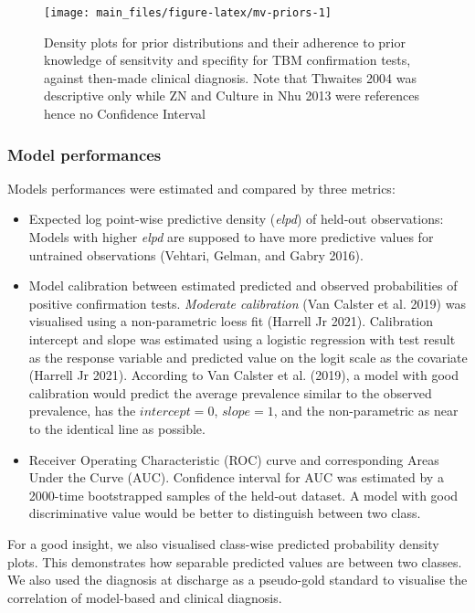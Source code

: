 \documentclass[
]{article}
\begin{document}
\begin{figure}

{\centering \texttt{[image: main\_files/figure-latex/mv-priors-1]} 

}

\caption{Density plots for prior distributions and their adherence to prior knowledge of sensitvity and specifity for TBM confirmation tests, against then-made clinical diagnosis. Note that Thwaites 2004 was descriptive only while ZN and Culture in Nhu 2013 were references hence no Confidence Interval}\label{fig:mv-priors}
\end{figure}

\hypertarget{model-performances}{%
\subsubsection{Model performances}\label{model-performances}}

Models performances were estimated and compared by three metrics:

\begin{itemize}
\item
  Expected log point-wise predictive density (\emph{elpd}) of held-out observations: Models with higher \emph{elpd} are supposed to have more predictive values for untrained observations (Vehtari, Gelman, and Gabry 2016).
\item
  Model calibration between estimated predicted and observed probabilities of positive confirmation tests. \emph{Moderate calibration} (Van Calster et al. 2019) was visualised using a non-parametric loess fit (Harrell Jr 2021). Calibration intercept and slope was estimated using a logistic regression with test result as the response variable and predicted value on the logit scale as the covariate (Harrell Jr 2021). According to Van Calster et al. (2019), a model with good calibration would predict the average prevalence similar to the observed prevalence, has the \(intercept = 0\), \(slope = 1\), and the non-parametric as near to the identical line as possible.
\item
  Receiver Operating Characteristic (ROC) curve and corresponding Areas Under the Curve (AUC). Confidence interval for AUC was estimated by a 2000-time bootstrapped samples of the held-out dataset. A model with good discriminative value would be better to distinguish between two class.
\end{itemize}

For a good insight, we also visualised class-wise predicted probability density plots. This demonstrates how separable predicted values are between two classes. We also used the diagnosis at discharge as a pseudo-gold standard to visualise the correlation of model-based and clinical diagnosis.
\end{document}
